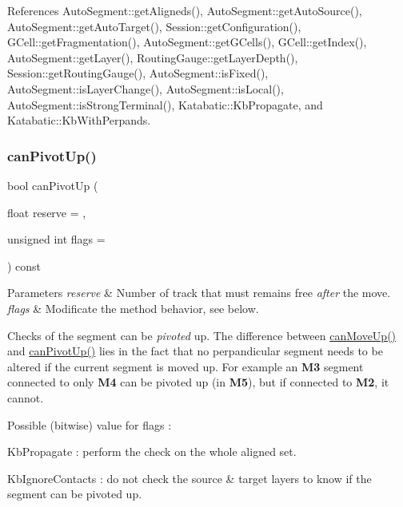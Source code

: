 References Auto\+Segment\+::get\+Aligneds(), Auto\+Segment\+::get\+Auto\+Source(), Auto\+Segment\+::get\+Auto\+Target(), Session\+::get\+Configuration(), G\+Cell\+::get\+Fragmentation(), Auto\+Segment\+::get\+G\+Cells(), G\+Cell\+::get\+Index(), Auto\+Segment\+::get\+Layer(), Routing\+Gauge\+::get\+Layer\+Depth(), Session\+::get\+Routing\+Gauge(), Auto\+Segment\+::is\+Fixed(), Auto\+Segment\+::is\+Layer\+Change(), Auto\+Segment\+::is\+Local(), Auto\+Segment\+::is\+Strong\+Terminal(), Katabatic\+::\+Kb\+Propagate, and Katabatic\+::\+Kb\+With\+Perpands.

\mbox{\label{classKatabatic_1_1AutoSegment_a6cca3afced729492cae6649a92dc7e88}} 
\subsubsection{\texorpdfstring{can\+Pivot\+Up()}{canPivotUp()}}
{\footnotesize\ttfamily bool can\+Pivot\+Up (\begin{DoxyParamCaption}\item[{float}]{reserve = {},  }\item[{unsigned int}]{flags = {} }\end{DoxyParamCaption}) const}


\begin{DoxyParams}{Parameters}
{\em reserve} & Number of track that must remains free {\itshape after} the move. \\
\hline
{\em flags} & Modificate the method behavior, see below.\\
\hline
\end{DoxyParams}
Checks of the segment can be {\itshape pivoted} up. The difference between {\ttfamily \hyperlink{classKatabatic_1_1AutoSegment_a6482341a342eb6e6b3b43f13fd4436f6}{can\+Move\+Up()}} and {\ttfamily \hyperlink{classKatabatic_1_1AutoSegment_a6cca3afced729492cae6649a92dc7e88}{can\+Pivot\+Up()}} lies in the fact that no perpandicular segment needs to be altered if the current segment is moved up. For example an {\bfseries M3} segment connected to only {\bfseries M4} can be pivoted up (in {\bfseries M5}), but if connected to {\bfseries M2}, it cannot.

Possible (bitwise) value for {\ttfamily flags} \+:
\begin{DoxyItemize}
\item {\ttfamily Kb\+Propagate} \+: perform the check on the whole aligned set.
\item {\ttfamily Kb\+Ignore\+Contacts} \+: do not check the source \& target layers to know if the segment can be pivoted up. 
\end{DoxyItemize}

